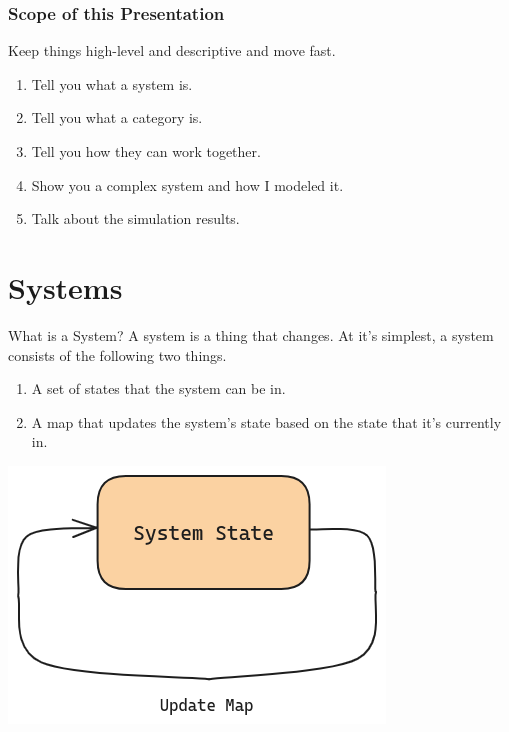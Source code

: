 \documentclass{beamer}
\begin{document}
\begin{frame}
    \frametitle{Scope of this Presentation}
    Keep things high-level and descriptive and move fast.

    \vspace*{0.125in}

    \begin{enumerate}
        \item Tell you what a system is.
        \item Tell you what a category is.
        \item Tell you how they can work together.
        \item Show you a complex system and how I modeled it.
        \item Talk about the simulation results.
    \end{enumerate}
\end{frame}



\section{Systems}


\begin{frame}{What is a System?}
    A system is a thing that changes. At it's simplest, a system consists of the following two things.

    \begin{enumerate}
        \item A set of states that the system can be in.
        \item A map that updates the system's state based on the state that it's currently in.
    \end{enumerate}

    \begin{center}
        \includegraphics[scale=0.35]{system_diagram_closed.png}
    \end{center}

\end{frame}
\end{document}
